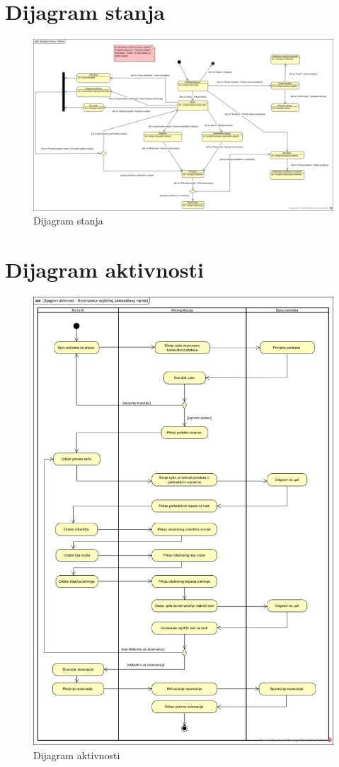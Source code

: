\eject

\section{Dijagram stanja}


\begin{figure}[H]
	\includegraphics[width=\textwidth]{slike/dijagram_stanja.jpg} %
	\centering
	\caption{Dijagram stanja}
	\label{fig:dijagramstanja}
\end{figure}


\eject 

\section{Dijagram aktivnosti}

\begin{figure}[H]
	\includegraphics[width=\textwidth, height=\textwidth]{slike/dijagram_aktivnosti.jpg} %
	\centering
	\caption{Dijagram aktivnosti}
	\label{fig:dijagramaktivnosti}
\end{figure}


